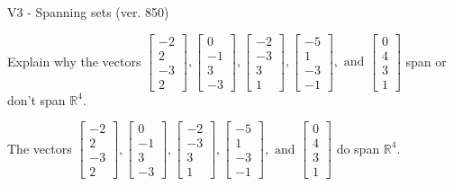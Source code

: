 \begin{exercise}
  \begin{exerciseTitle}V3 - Spanning sets (ver. 850)\end{exerciseTitle}
  \begin{exerciseStatement}
    Explain why the vectors \(\left[\begin{array}{r}
-2 \\
2 \\
-3 \\
2
\end{array}\right] , \left[\begin{array}{r}
0 \\
-1 \\
3 \\
-3
\end{array}\right] , \left[\begin{array}{r}
-2 \\
-3 \\
3 \\
1
\end{array}\right] , \left[\begin{array}{r}
-5 \\
1 \\
-3 \\
-1
\end{array}\right] , \text{ and } \left[\begin{array}{r}
0 \\
4 \\
3 \\
1
\end{array}\right]\) span or don't span \(\mathbb{R}^4\). 
	


  \end{exerciseStatement}
  \begin{exerciseAnswer}
   The vectors \(\left[\begin{array}{r}
-2 \\
2 \\
-3 \\
2
\end{array}\right] , \left[\begin{array}{r}
0 \\
-1 \\
3 \\
-3
\end{array}\right] , \left[\begin{array}{r}
-2 \\
-3 \\
3 \\
1
\end{array}\right] , \left[\begin{array}{r}
-5 \\
1 \\
-3 \\
-1
\end{array}\right] , \text{ and } \left[\begin{array}{r}
0 \\
4 \\
3 \\
1
\end{array}\right]\) 
  	 do  
	span \(\mathbb{R}^4\).
  



\end{exerciseAnswer}
\end{exercise}
